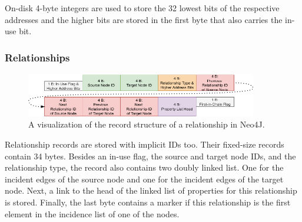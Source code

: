             On-disk 4-byte integers are used to store the 32 lowest bits of the respective addresses and the higher bits are stored in the first byte that also carries the in-use bit.
        
        \subsubsection*{Relationships}\label{n4j-rel}
            \begin{figure}[htp]
                \begin{center}
                    \includegraphics[keepaspectratio,height=0.9\textheight,width=0.9\textwidth]{img/04-databases/relationship_record.png}
                \end{center}
                \caption{A visualization of the record structure of a relationship in Neo4J.}
                \label{rel_record}
            \end{figure}
                
            Relationship records are stored with implicit IDs too. 
            Their fixed-size records contain 34 bytes.
            Besides an in-use flag, the source and target node IDs, and the relationship type, the record also contains two doubly linked list.
            One for the incident edges of the source node and one for the incident edges of the target node.
            Next, a link to the head of the linked list of properties for this relationship is stored.
            Finally, the last byte contains a marker if this relationship is the first element in the incidence list of one of the nodes.
            
